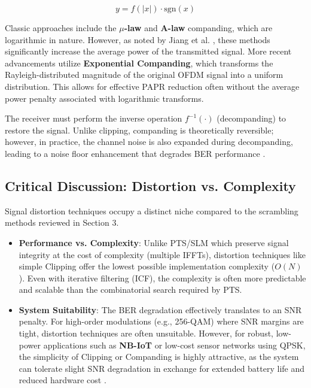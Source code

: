 \documentclass[journal]{IEEEtran}
\begin{document}
\begin{equation}
    y = f(|x|) \cdot \text{sgn}(x)
\end{equation}

Classic approaches include the \textbf{$\mu$-law} and \textbf{A-law} companding, which are logarithmic in nature. However, as noted by Jiang et al. \cite{ref10}, these methods significantly increase the average power of the transmitted signal. More recent advancements utilize \textbf{Exponential Companding}, which transforms the Rayleigh-distributed magnitude of the original OFDM signal into a uniform distribution. This allows for effective PAPR reduction often without the average power penalty associated with logarithmic transforms.

The receiver must perform the inverse operation $f^{-1}(\cdot)$ (decompanding) to restore the signal. Unlike clipping, companding is theoretically reversible; however, in practice, the channel noise is also expanded during decompanding, leading to a noise floor enhancement that degrades BER performance \cite{ref11}.

\subsection{Critical Discussion: Distortion vs. Complexity}
Signal distortion techniques occupy a distinct niche compared to the scrambling methods reviewed in Section 3.

\begin{itemize}
    \item \textbf{Performance vs. Complexity}: Unlike PTS/SLM which preserve signal integrity at the cost of complexity (multiple IFFTs), distortion techniques like simple Clipping offer the lowest possible implementation complexity ($O(N)$). Even with iterative filtering (ICF), the complexity is often more predictable and scalable than the combinatorial search required by PTS.
    \item \textbf{System Suitability}: The BER degradation effectively translates to an SNR penalty. For high-order modulations (e.g., 256-QAM) where SNR margins are tight, distortion techniques are often unsuitable. However, for robust, low-power applications such as \textbf{NB-IoT} or low-cost sensor networks using QPSK, the simplicity of Clipping or Companding is highly attractive, as the system can tolerate slight SNR degradation in exchange for extended battery life and reduced hardware cost \cite{ref12}.
\end{itemize}
\end{document}
